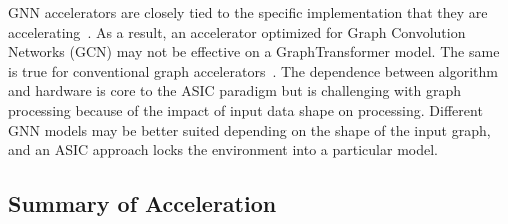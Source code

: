 GNN accelerators are closely tied to the specific implementation that they are accelerating~\cite{Abi2023}. 
As a result, an accelerator optimized for Graph Convolution Networks (GCN) may not be effective on a GraphTransformer model.
The same is true for conventional graph accelerators~\cite{Dadu2021}.
The dependence between algorithm and hardware is core to the ASIC paradigm but is challenging with graph processing because of the impact of input data shape on processing. 
Different GNN models may be better suited depending on the shape of the input graph, and an ASIC approach locks the environment into a particular model. 

\subsection{Summary of \gai Acceleration}









